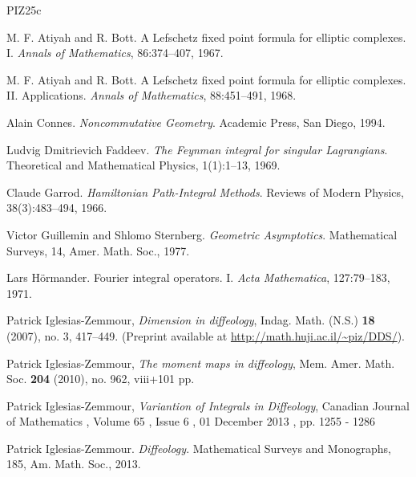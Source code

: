   
  \begin{thebibliography}{PIZ25c}
    
    M. F. Atiyah and R. Bott.
    A Lefschetz fixed point formula for elliptic complexes. I.
    {\em Annals of Mathematics}, 86:374--407, 1967.
    
    M. F. Atiyah and R. Bott.
    A Lefschetz fixed point formula for elliptic complexes. II. Applications.
    {\em Annals of Mathematics}, 88:451--491, 1968.
    
    Alain Connes.
    {\em Noncommutative Geometry}.
    Academic Press, San Diego, 1994.
    
    Ludvig Dmitrievich Faddeev.
    \emph{The Feynman integral for singular Lagrangians}.
    Theoretical and Mathematical Physics, 1(1):1--13, 1969.
    
    Claude Garrod.
    \emph{Hamiltonian Path-Integral Methods}.
    Reviews of Modern Physics,
    38(3):483--494,
    1966.
    
    Victor Guillemin and Shlomo Sternberg.
    \emph{Geometric Asymptotics}.
    Mathematical Surveys, 14, Amer. Math. Soc., 1977.
    
    Lars H\"ormander.
    Fourier integral operators. I.
    {\em Acta Mathematica}, 127:79--183, 1971.
    
    Patrick Iglesias-Zemmour,
    \emph{Dimension in diffeology},
    Indag. Math. (N.S.) \textbf{18} (2007), no. 3, 417--449. (Preprint available at \url{http://math.huji.ac.il/~piz/DDS/}).
    
    Patrick Iglesias-Zemmour,
    \emph{The moment maps in diffeology},
    Mem. Amer. Math. Soc. \textbf{204} (2010), no. 962, viii+101 pp.
    
    Patrick Iglesias-Zemmour,
    \emph{Variantion of Integrals in Diffeology},
    Canadian Journal of Mathematics , Volume 65 , Issue 6 , 01 December 2013 , pp. 1255 - 1286
    
    Patrick Iglesias-Zemmour.
    {\em Diffeology}.
    Mathematical Surveys and Monographs, 185, Am. Math. Soc., 2013.
    

\end{thebibliography}
